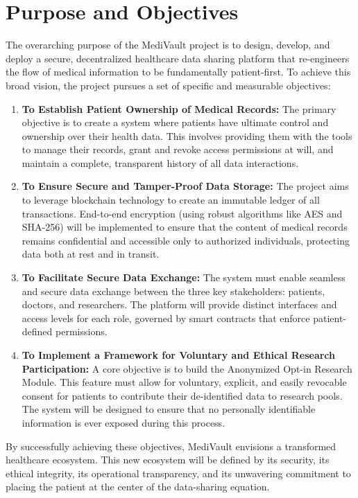\section{Purpose and Objectives}
The overarching purpose of the MediVault project is to design, develop, and deploy a secure, decentralized healthcare data sharing platform that re-engineers the flow of medical information to be fundamentally patient-first. To achieve this broad vision, the project pursues a set of specific and measurable objectives:

\begin{enumerate}
    \item \textbf{To Establish Patient Ownership of Medical Records:} The primary objective is to create a system where patients have ultimate control and ownership over their health data. This involves providing them with the tools to manage their records, grant and revoke access permissions at will, and maintain a complete, transparent history of all data interactions.

    \item \textbf{To Ensure Secure and Tamper-Proof Data Storage:} The project aims to leverage blockchain technology to create an immutable ledger of all transactions. End-to-end encryption (using robust algorithms like AES and SHA-256) will be implemented to ensure that the content of medical records remains confidential and accessible only to authorized individuals, protecting data both at rest and in transit.

    \item \textbf{To Facilitate Secure Data Exchange:} The system must enable seamless and secure data exchange between the three key stakeholders: patients, doctors, and researchers. The platform will provide distinct interfaces and access levels for each role, governed by smart contracts that enforce patient-defined permissions.

    \item \textbf{To Implement a Framework for Voluntary and Ethical Research Participation:} A core objective is to build the Anonymized Opt-in Research Module. This feature must allow for voluntary, explicit, and easily revocable consent for patients to contribute their de-identified data to research pools. The system will be designed to ensure that no personally identifiable information is ever exposed during this process.
\end{enumerate}

By successfully achieving these objectives, MediVault envisions a transformed healthcare ecosystem. This new ecosystem will be defined by its security, its ethical integrity, its operational transparency, and its unwavering commitment to placing the patient at the center of the data-sharing equation.

